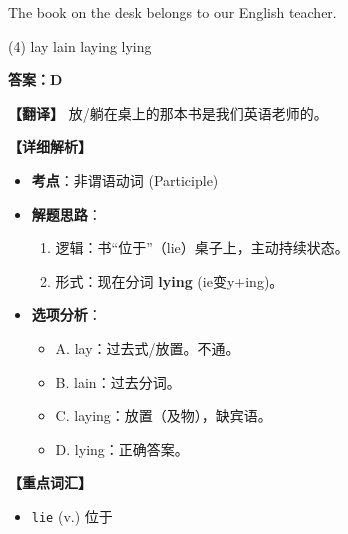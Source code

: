 \documentclass[11pt, a4paper]{article}
\newcommand{\analysis}[4]{
    \begin{solutionbox}
        \textbf{答案：#1}
        
        \textbf{【翻译】} #2
        
        \textbf{【详细解析】}
        #3
        
        \textbf{【重点词汇】}
        #4
    \end{solutionbox}
}
\newcommand{\blank}{\underline{\hspace{1.5cm}}}
\begin{document}
\begin{questions}
    \item The book \blank on the desk belongs to our English teacher.
    \begin{tasks}(4)
        \task lay \task lain \task laying \task lying
    \end{tasks}
    \analysis{D}{放/躺在桌上的那本书是我们英语老师的。}{
        \begin{itemize}
            \item \textbf{考点}：非谓语动词 (Participle)
            \item \textbf{解题思路}：
                \begin{enumerate}
                    \item 逻辑：书“位于”（lie）桌子上，主动持续状态。
                    \item 形式：现在分词 \textbf{lying} (ie变y+ing)。
                \end{enumerate}
            \item \textbf{选项分析}：
                \begin{itemize}
                    \item A. lay：过去式/放置。不通。
                    \item B. lain：过去分词。
                    \item C. laying：放置（及物），缺宾语。
                    \item D. lying：正确答案。
                \end{itemize}
        \end{itemize}
    }{
        \begin{itemize}
            \item \texttt{lie} (v.) 位于
        \end{itemize}
    }


\end{questions}
\end{document}
